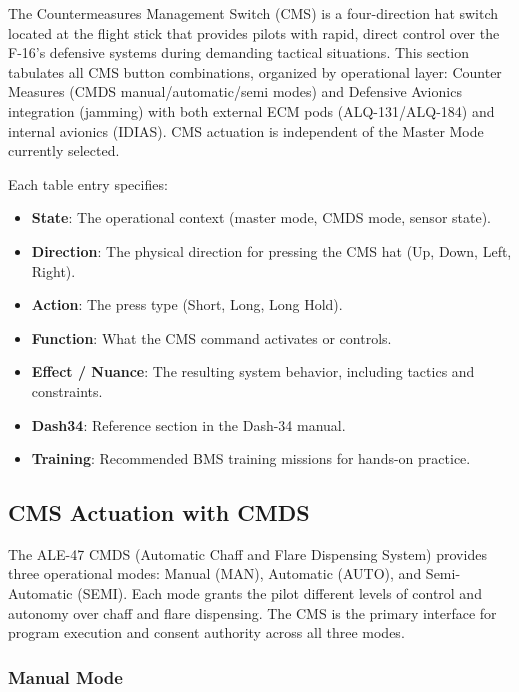 \documentclass[11pt, a4paper, twoside]{report}
\begin{document}
The Countermeasures Management Switch (CMS) is a four-direction hat switch located at the flight stick that provides pilots with rapid, direct control over the F-16's defensive systems during demanding tactical situations. This section tabulates all CMS button combinations, organized by operational layer: Counter Measures (CMDS manual/automatic/semi modes) and Defensive Avionics integration (jamming) with both external ECM pods (ALQ-131/ALQ-184) and internal avionics (IDIAS). CMS actuation is independent of the Master Mode currently selected.

Each table entry specifies:

\begin{itemize}
  \item \textbf{State}: The operational context (master mode, CMDS mode, sensor state).
  \item \textbf{Direction}: The physical direction for pressing the CMS hat (Up, Down, Left, Right).
  \item \textbf{Action}: The press type (Short, Long, Long Hold).
  \item \textbf{Function}: What the CMS command activates or controls.
  \item \textbf{Effect / Nuance}: The resulting system behavior, including tactics and constraints.
  \item \textbf{Dash34}: Reference section in the Dash-34 manual.
  \item \textbf{Training}: Recommended BMS training missions for hands-on practice.
\end{itemize}

\subsection{CMS Actuation with CMDS}
\label{sec:C5-S2-S1}

The ALE-47 CMDS (Automatic Chaff and Flare Dispensing System) provides three operational modes: Manual (MAN), Automatic (AUTO), and Semi-Automatic (SEMI). Each mode grants the pilot different levels of control and autonomy over chaff and flare dispensing. The CMS is the primary interface for program execution and consent authority across all three modes.

\subsubsection{Manual Mode}
\label{sec:C5-S2-S1-S1}
\end{document}
